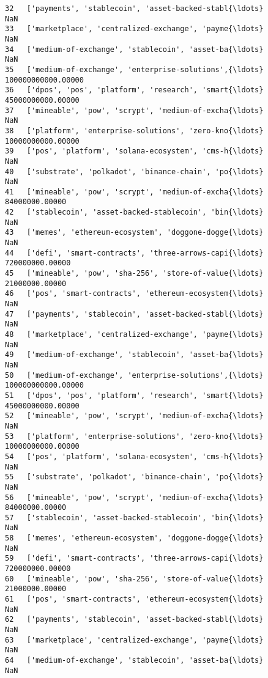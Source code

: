 \documentclass[11pt]{article}
\begin{document}
\begin{tcolorbox}[breakable, size=fbox, boxrule=.5pt, pad at break*=1mm, opacityfill=0]
\begin{Verbatim}[commandchars=\\\{\}]
32   ['payments', 'stablecoin', 'asset-backed-stabl{\ldots}                NaN
33   ['marketplace', 'centralized-exchange', 'payme{\ldots}                NaN
34   ['medium-of-exchange', 'stablecoin', 'asset-ba{\ldots}                NaN
35   ['medium-of-exchange', 'enterprise-solutions',{\ldots} 100000000000.00000
36   ['dpos', 'pos', 'platform', 'research', 'smart{\ldots}  45000000000.00000
37   ['mineable', 'pow', 'scrypt', 'medium-of-excha{\ldots}                NaN
38   ['platform', 'enterprise-solutions', 'zero-kno{\ldots}  10000000000.00000
39   ['pos', 'platform', 'solana-ecosystem', 'cms-h{\ldots}                NaN
40   ['substrate', 'polkadot', 'binance-chain', 'po{\ldots}                NaN
41   ['mineable', 'pow', 'scrypt', 'medium-of-excha{\ldots}     84000000.00000
42   ['stablecoin', 'asset-backed-stablecoin', 'bin{\ldots}                NaN
43   ['memes', 'ethereum-ecosystem', 'doggone-dogge{\ldots}                NaN
44   ['defi', 'smart-contracts', 'three-arrows-capi{\ldots}    720000000.00000
45   ['mineable', 'pow', 'sha-256', 'store-of-value{\ldots}     21000000.00000
46   ['pos', 'smart-contracts', 'ethereum-ecosystem{\ldots}                NaN
47   ['payments', 'stablecoin', 'asset-backed-stabl{\ldots}                NaN
48   ['marketplace', 'centralized-exchange', 'payme{\ldots}                NaN
49   ['medium-of-exchange', 'stablecoin', 'asset-ba{\ldots}                NaN
50   ['medium-of-exchange', 'enterprise-solutions',{\ldots} 100000000000.00000
51   ['dpos', 'pos', 'platform', 'research', 'smart{\ldots}  45000000000.00000
52   ['mineable', 'pow', 'scrypt', 'medium-of-excha{\ldots}                NaN
53   ['platform', 'enterprise-solutions', 'zero-kno{\ldots}  10000000000.00000
54   ['pos', 'platform', 'solana-ecosystem', 'cms-h{\ldots}                NaN
55   ['substrate', 'polkadot', 'binance-chain', 'po{\ldots}                NaN
56   ['mineable', 'pow', 'scrypt', 'medium-of-excha{\ldots}     84000000.00000
57   ['stablecoin', 'asset-backed-stablecoin', 'bin{\ldots}                NaN
58   ['memes', 'ethereum-ecosystem', 'doggone-dogge{\ldots}                NaN
59   ['defi', 'smart-contracts', 'three-arrows-capi{\ldots}    720000000.00000
60   ['mineable', 'pow', 'sha-256', 'store-of-value{\ldots}     21000000.00000
61   ['pos', 'smart-contracts', 'ethereum-ecosystem{\ldots}                NaN
62   ['payments', 'stablecoin', 'asset-backed-stabl{\ldots}                NaN
63   ['marketplace', 'centralized-exchange', 'payme{\ldots}                NaN
64   ['medium-of-exchange', 'stablecoin', 'asset-ba{\ldots}                NaN

\end{Verbatim}
\end{tcolorbox}
\end{document}
